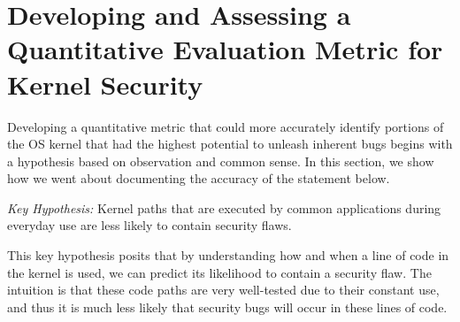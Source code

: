 \section{Developing and Assessing a Quantitative Evaluation Metric for Kernel Security}
\label{sec.metric}
Developing a quantitative metric that could more accurately identify portions of
the OS kernel that had the highest potential to unleash inherent bugs begins with a
hypothesis based on observation and common sense. In this section, we show how we
went about documenting the accuracy of the statement below.

\emph{Key Hypothesis:} Kernel paths that are executed by common applications
during everyday use are less likely to contain security flaws.

This key hypothesis posits that by understanding how and when
a line of code in the kernel is used, we can predict its likelihood to
contain a security flaw.
The intuition is that these code paths are very well-tested
due to their constant use, and thus it is much less likely that security bugs
will occur in these lines of code.










